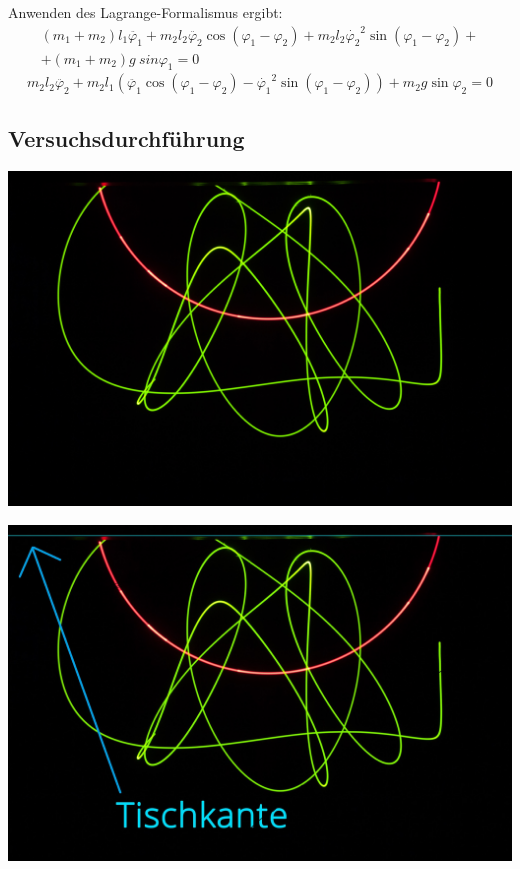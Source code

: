 \begin{frame}
	\begin{block}{Anwenden des Lagrange-Formalismus ergibt:}
		\small		
		\begin{equation}
		\begin{split}
			(m_1 + m_2) l_1\ddot{\varphi_1} + m_2 l_2 \ddot{\varphi_2} \cos (\varphi_1 - \varphi_2) + m_2 l_2 \dot{\varphi_2}^2 \sin (\varphi_1 - \varphi_2) +\\+ (m_1 + m_2) g \ sin \varphi_1 = 0
\end{split}
\end{equation}
\begin{equation}
m_2 l_2 \ddot{\varphi_2} + m_2 l_1 (\ddot{\varphi_1} \cos (\varphi_1 - \varphi_2) - \dot{\varphi_1}^2 \sin (\varphi_1 - \varphi_2)) + m_2 g \sin \varphi_2 = 0
		\end{equation}
	\end{block}
\end{frame}


\subsection{Versuchsdurchführung}
\begin{frame}
	\includegraphics[width=\textwidth]{images/4/pendel-10}
\end{frame}

\begin{frame}
	\includegraphics[width=\textwidth]{images/4/tischkante}
\end{frame}

